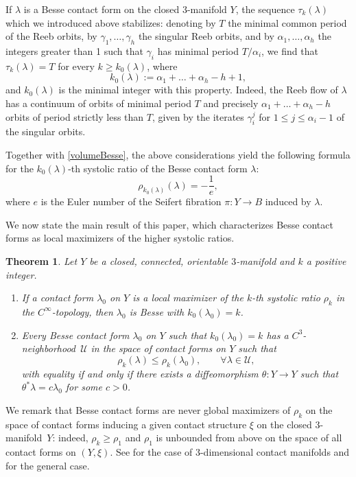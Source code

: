 \documentclass[JEP,XML,SOM,Unicode,published]{cedram}
\newenvironment{enumeratei}
{\bgroup\def\theenumi{\roman{enumi}}\def\theenumii{\arabic{enumii}}\begin{enumerate}}
{\end{enumerate}\egroup}
\newtheorem{maintheorem}{Theorem}
\theoremstyle{definition}
\newcommand{\UU}{\mathcal{U}}
\let\eul e
\begin{document}
If $\lambda$ is a Besse contact form on the closed $3$-manifold $Y$, the sequence $\tau_k(\lambda)$ which we introduced above stabilizes: denoting by $T$ the minimal common period of the Reeb orbits, by $\gamma_1,\dots,\gamma_h$ the singular Reeb orbits, and by $\alpha_1,\dots,\alpha_h$ the integers greater than 1 such that $\gamma_i$ has minimal period $T/\alpha_i$, we find that $\tau_k(\lambda)=T$ for every $k\geq k_0(\lambda)$, where
\[
k_0(\lambda):= \alpha_1+\dots+\alpha_h - h + 1,
\]
and $k_0(\lambda)$ is the minimal integer with this property. Indeed, the Reeb flow of $\lambda$ has a continuum of orbits of minimal period $T$ and precisely $\alpha_1+\dots+\alpha_h - h$ orbits of period strictly less than $T$, given by the iterates $\gamma_i^j$ for $1\leq j \leq \alpha_i - 1$ of the singular orbits.

Together with \eqref{volumeBesse}, the above considerations yield the following formula for the $k_0(\lambda)$-th systolic ratio of the Besse contact form $\lambda$:
\[
\rho_{k_0(\lambda)} (\lambda) = - \frac{1}{\eul},
\]
where $\eul$ is the Euler number of the Seifert fibration $\pi:Y\to B$ induced by $\lambda$.

We now state the main result of this paper, which characterizes Besse contact forms as local maximizers of the higher systolic ratios.

\begin{maintheorem}
\label{t:main}
Let $Y$ be a closed, connected, orientable $3$-manifold and $k$ a positive integer.
\begin{enumeratei}
\item\label{t:maini}
 If a contact form $\lambda_0$ on $Y$ is a local maximizer of the $k$-th systolic ratio $\rho_k$ in the $C^{\infty}$-topology, then $\lambda_0$ is Besse with $k_0(\lambda_0)=k$.

\item\label{t:mainii}
Every Besse contact form $\lambda_0$ on $Y$ such that $k_0(\lambda_0)=k$ has a $C^3$-neighbor\-hood~$\UU$ in the space of contact forms on $Y$ such that
\[
\rho_k(\lambda) \leq \rho_k(\lambda_0), \qquad \forall \lambda\in \UU,
\]
with equality if and only if there exists a diffeomorphism $\theta:Y\to Y$ such that $\theta^*\lambda=c\lambda_0$ for some $c>0$.
\end{enumeratei}
\end{maintheorem}

We remark that Besse contact forms are never global maximizers of $\rho_k$ on the space of contact forms inducing a given contact structure $\xi$ on the closed $3$-manifold~$Y$: indeed, $\rho_k\geq \rho_1$ and $\rho_1$ is unbounded from above on the space of all contact forms on $(Y,\xi)$. See \cite{Abbondandolo:2019ta} for the case of 3-dimensional contact manifolds and \cite{Saglam:2018tb} for the general case.
\end{document}
